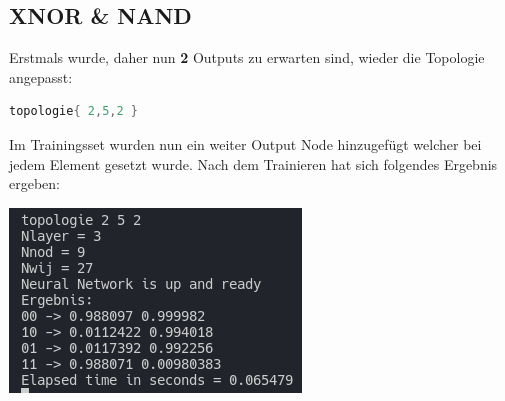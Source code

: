 \subsection{XNOR \& NAND}
Erstmals wurde, daher nun \textbf{2} Outputs zu erwarten sind, wieder die Topologie angepasst:

\begin{lstlisting}[language=c]
	topologie{ 2,5,2 }
\end{lstlisting}

Im Trainingsset wurden nun ein weiter Output Node hinzugefügt welcher bei jedem Element gesetzt wurde. Nach dem Trainieren hat sich folgendes Ergebnis ergeben:

\begin{minipage}{\linewidth}
	\centering
	\includegraphics[width=0.6\linewidth]{images/3}
\end{minipage}

